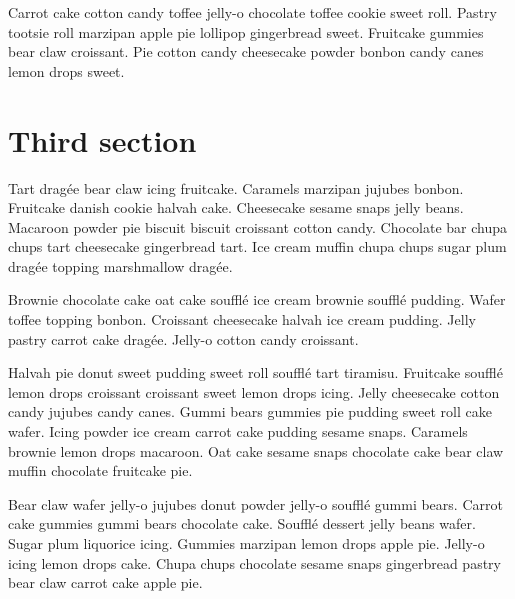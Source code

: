 \documentclass{article}
\begin{document}
Carrot cake cotton candy toffee jelly-o chocolate toffee cookie sweet roll. Pastry tootsie roll marzipan apple pie lollipop gingerbread sweet. Fruitcake gummies bear claw croissant. Pie cotton candy cheesecake powder bonbon candy canes lemon drops sweet.

\newpage
\section{Third section}

Tart dragée bear claw icing fruitcake. Caramels marzipan jujubes bonbon. Fruitcake danish cookie halvah cake. Cheesecake sesame snaps jelly beans. Macaroon powder pie biscuit biscuit croissant cotton candy. Chocolate bar chupa chups tart cheesecake gingerbread tart. Ice cream muffin chupa chups sugar plum dragée topping marshmallow dragée. 

Brownie chocolate cake oat cake soufflé ice cream brownie soufflé pudding. Wafer toffee topping bonbon. Croissant cheesecake halvah ice cream pudding. Jelly pastry carrot cake dragée. Jelly-o cotton candy croissant.

Halvah pie donut sweet pudding sweet roll soufflé tart tiramisu. Fruitcake soufflé lemon drops croissant croissant sweet lemon drops icing. Jelly cheesecake cotton candy jujubes candy canes. Gummi bears gummies pie pudding sweet roll cake wafer. Icing powder ice cream carrot cake pudding sesame snaps. Caramels brownie lemon drops macaroon. Oat cake sesame snaps chocolate cake bear claw muffin chocolate fruitcake pie.

Bear claw wafer jelly-o jujubes donut powder jelly-o soufflé gummi bears. Carrot cake gummies gummi bears chocolate cake. Soufflé dessert jelly beans wafer. Sugar plum liquorice icing. Gummies marzipan lemon drops apple pie. Jelly-o icing lemon drops cake. Chupa chups chocolate sesame snaps gingerbread pastry bear claw carrot cake apple pie.
\end{document}
